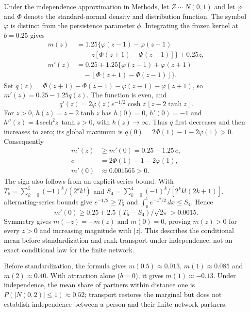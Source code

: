 Under the independence approximation in Methods, let $Z\sim N(0,1)$ and let $\varphi$ and $\Phi$ denote the standard-normal density and distribution function. The symbol $\varphi$ is distinct from the persistence parameter $\phi$. Integrating the frozen kernel at $b=0.25$ gives
\begin{align*}
m(z)&=1.25\bigl\{\varphi(z-1)-\varphi(z+1)\\
    &\quad-z[\Phi(z+1)-\Phi(z-1)]\bigr\}+0.25z,\\
m'(z)&=0.25+1.25\bigl\{\varphi(z-1)+\varphi(z+1)\\
     &\quad-[\Phi(z+1)-\Phi(z-1)]\bigr\}.
\end{align*}
Set $q(z)=\Phi(z+1)-\Phi(z-1)-\varphi(z-1)-\varphi(z+1)$, so $m'(z)=0.25-1.25q(z)$. The function is even, and
\begin{equation*}
q'(z)=2\varphi(z)e^{-1/2}\cosh z\,[z-2\tanh z].
\end{equation*}
For $z>0$, $h(z)=z-2\tanh z$ has $h(0)=0$, $h'(0)=-1$ and $h''(z)=4\,\mathrm{sech}^2z\,\tanh z>0$, with $h(z)\to\infty$. Thus $q$ first decreases and then increases to zero; its global maximum is $q(0)=2\Phi(1)-1-2\varphi(1)>0$. Consequently
\begin{align*}
m'(z)&\ge m'(0)=0.25-1.25\,c,\\
c&=2\Phi(1)-1-2\varphi(1),\\
m'(0)&\approx0.001565>0.
\end{align*}
The sign also follows from an explicit series bound. With $T_5=\sum_{k=0}^{5}(-1)^k/(2^k k!)$ and $S_4=\sum_{k=0}^{4}(-1)^k/[2^k k!(2k+1)]$, alternating-series bounds give $e^{-1/2}\ge T_5$ and $\int_0^1e^{-x^2/2}\,dx\le S_4$. Hence
\begin{equation*}
m'(0)\ge0.25+2.5\,(T_5-S_4)/\sqrt{2\pi}>0.0015.
\end{equation*}
Symmetry gives $m(-z)=-m(z)$ and $m(0)=0$, proving $m(z)>0$ for every $z>0$ and increasing magnitude with $|z|$. This describes the conditional mean before standardization and rank transport under independence, not an exact conditional law for the finite network.

Before standardization, the formula gives $m(0.5)\approx0.013$, $m(1)\approx0.085$ and $m(2)\approx0.40$. With attraction alone ($b=0$), it gives $m(1)\approx-0.13$. Under independence, the mean share of partners within distance one is $P(|N(0,2)|\le1)\approx0.52$; transport restores the marginal but does not establish independence between a person and their finite-network partners. %

